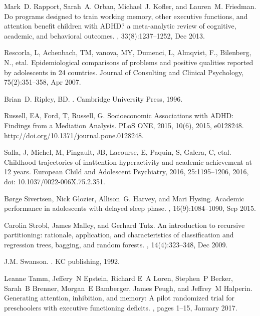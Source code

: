 \documentclass[10pt,letterpaper]{article}
\begin{document}
\begin{thebibliography}{10}
Mark~D. Rapport, Sarah~A. Orban, Michael~J. Kofler, and Lauren~M. Friedman.
\newblock Do programs designed to train working memory, other executive
  functions, and attention benefit children with {ADHD}? a meta-analytic review
  of cognitive, academic, and behavioral outcomes.
, 33(8):1237--1252, Dec 2013.

Rescorla, L, Achenbach, TM, vanova, MY, Dumenci, L, 
  Almqvist, F., Bilenberg, N., etal. 
\newblock Epidemiological comparisons of problems and positive qualities
  reported by adolescents in 24 countries.
\newblock Journal of Consulting and Clinical Psychology, 75(2):351--358,
  Apr 2007.

Brian~D. Ripley, BD.
.
\newblock Cambridge University Press, 1996.

Russell, EA, Ford, T, Russell, G.
\newblock Socioeconomic Associations with ADHD: Findings from a Mediation Analysis.
\newblock PLoS ONE, 2015, 10(6), 2015, e0128248. http://doi.org/10.1371/journal.pone.0128248.

Salla, J, Michel, M, Pingault, JB, Lacourse, E, 
  Paquin, S, Galera, C, etal. 
\newblock Childhood trajectories of inattention-hyperactivity and academic
  achievement at 12 years.
\newblock European Child and Adolescent Psychiatry, 2016,  25:1195--1206,
  2016, doi: 10.1037/0022-006X.75.2.351.

B\o{}rge Sivertsen, Nick Glozier, Allison~G. Harvey, and Mari Hysing.
\newblock Academic performance in adolescents with delayed sleep phase.
, 16(9):1084--1090, Sep 2015.

Carolin Strobl, James Malley, and Gerhard Tutz.
\newblock An introduction to recursive partitioning: rationale, application,
  and characteristics of classification and regression trees, bagging, and
  random forests.
, 14(4):323--348, Dec 2009.

J.M. Swanson.
.
\newblock KC publishing, 1992.

Leanne Tamm, Jeffery~N Epstein, Richard E~A Loren, Stephen~P Becker, Sarah~B
  Brenner, Morgan~E Bamberger, James Peugh, and Jeffrey~M Halperin.
\newblock Generating attention, inhibition, and memory: A pilot randomized
  trial for preschoolers with executive functioning deficits.
, pages
  1--15, January 2017.
%

\end{thebibliography}
\end{document}
